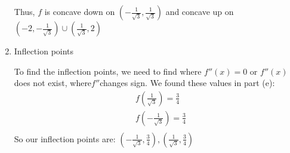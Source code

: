 \documentclass[nooutcomes]{ximera}
\begin{document}
\begin{problem}
\begin{enumerate}
\begin{freeResponse}
		
\begin{center}
\begin{image}
\end{image}
\end{center}


		
		
		Thus, $f$ is concave down on $\left( - \frac{1}{\sqrt{3}}, \frac{1}{\sqrt{3}} \right)$ and concave up on \\ 
		$\left( -2, - \frac{1}{\sqrt{3}} \right) \cup \left( \frac{1}{\sqrt{3}}, 2 \right)$
		\end{freeResponse}
		
	\item  Inflection points
	
		\begin{freeResponse}
		To find the inflection points, we need to find where $f''(x)=0$ or $f''(x)$ does not exist,  where$f''$changes sign.  We found these values in part (e):
		\begin{align*}
 		 & f\left( \frac{1}{\sqrt{3}} \right)=\frac{3}{4} \\ 
 		& f\left( -\frac{1}{\sqrt{3}} \right)=\frac{3}{4} \\ 
		\end{align*}  
		So our inflection points are: $\left( -\frac{1}{\sqrt{3}},\frac{3}{4} \right),\left( \frac{1}{\sqrt{3}},\frac{3}{4} \right)$
		\end{freeResponse}
		

\end{enumerate}
\end{problem}
\end{document}
